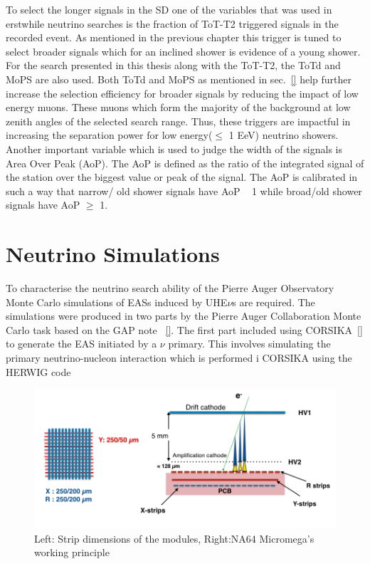 To select the longer signals in the SD one of the variables that was used in erstwhile neutrino searches is the fraction of ToT-T2 triggered signals in the recorded event. As mentioned in the previous chapter this trigger is tuned to select broader signals which for an inclined shower is evidence of a young shower. For the search presented in this thesis along with the ToT-T2, the ToTd and MoPS are also used. Both ToTd and MoPS as mentioned in sec.~\ref{} help further increase the selection efficiency for broader signals by reducing the impact of low energy muons. These muons which form the majority of the background at low zenith angles of the selected search range. Thus, these triggers are impactful in increasing the separation power for low energy($\leq$ 1 EeV) neutrino showers. Another important variable which is used to judge the width of the signals is Area Over Peak (AoP). The AoP is defined as the ratio of the integrated signal of the station over the biggest value or peak of the signal. The AoP is calibrated in such a way that narrow/ old shower signals have AoP ~ 1 while broad/old shower signals have AoP $\geqslant $ 1. 



\section{Neutrino Simulations}
\label{sec:sim_DGL}
To characterise the neutrino search ability of the Pierre Auger Observatory Monte Carlo simulations of EASs induced by UHE$\nu$s are required. The simulations were produced in two parts by the Pierre Auger Collaboration Monte Carlo task based on the GAP note ~\ref{}. The first part included using CORSIKA~\ref{} to generate the EAS initiated by a $\nu$ primary. This involves simulating the primary neutrino-nucleon interaction which is performed i CORSIKA using the HERWIG code  









\begin{figure}[t!]
\centering
\includegraphics[width=\textwidth]{thesis_figures/NA64_MM.png}
\caption{Left: Strip dimensions of the modules, Right:NA64 Micromega's working principle~\cite{Banerjee:2017mdu}}
\label{fig:Micromegas_na64}
\end{figure}

